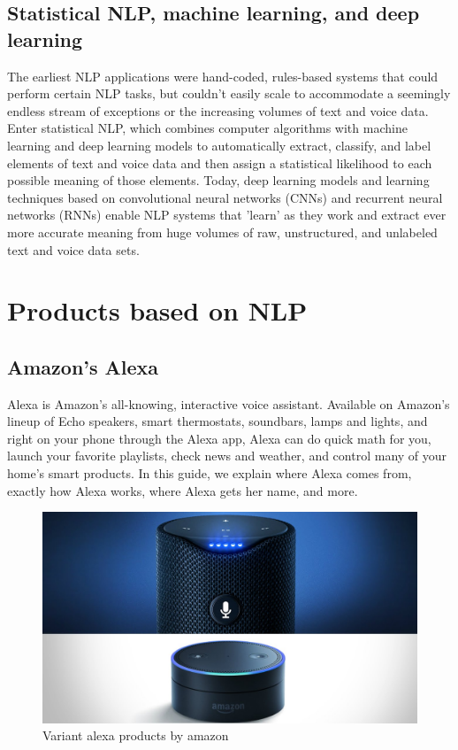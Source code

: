 \documentclass[11pt]{article}
\begin{document}
\subsection{Statistical NLP, machine learning, and deep learning}
\label{sec:orgd9f286d}
The earliest NLP applications were hand-coded, rules-based systems that could perform
certain NLP tasks, but couldn't easily scale to accommodate a seemingly endless stream
of exceptions or the increasing volumes of text and voice data.
Enter statistical NLP, which combines computer algorithms with machine learning and
deep learning models to automatically extract, classify, and label elements of text
and voice data and then assign a statistical likelihood to each possible meaning of
those elements. Today, deep learning models and learning techniques based on
convolutional neural networks (CNNs) and recurrent neural networks (RNNs) enable
NLP systems that 'learn' as they work and extract ever more accurate meaning from
huge volumes of raw, unstructured, and unlabeled text and voice data sets. 
\clearpage

\section{Products based on NLP}
\label{sec:org643b718}
\subsection{Amazon's Alexa}
\label{sec:org24a9c5f}
Alexa is Amazon’s all-knowing, interactive voice assistant. Available on Amazon’s
lineup of Echo speakers, smart thermostats, soundbars, lamps and lights, and right
on your phone through the Alexa app, Alexa can do quick math for you, launch your
favorite playlists, check news and weather, and control many of your home’s smart products.
In this guide, we explain where Alexa comes from, exactly how Alexa works, where
Alexa gets her name, and more.
\begin{figure}[htbp]
\centering
\includegraphics[width=.9\linewidth]{./img/alexa.png}
\caption{\label{fig:orgce10069}Variant alexa products by amazon}
\end{figure}   
\end{document}
